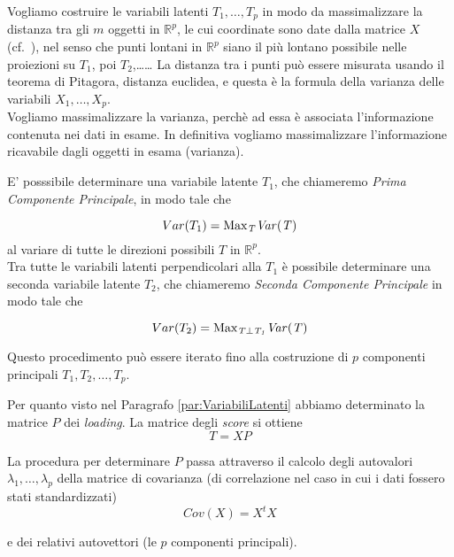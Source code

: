 \documentclass[
  11pt,
]{book}
\begin{document}
Vogliamo costruire le variabili latenti \(T_1,\dots,T_p\) in modo da massimalizzare la distanza
tra gli \(m\) oggetti in \(\mathbb{R}^p\), le cui coordinate sono date dalla matrice \(X\) (cf.~),
nel senso che punti lontani in \(\mathbb{R}^p\) siano il più
lontano possibile nelle proiezioni su \(T_1\), poi \(T_2\),\ldots\ldots{}
La distanza tra i punti può essere misurata usando il teorema di Pitagora, distanza euclidea,
e questa è la formula della varianza delle variabili \(X_1,\dots,X_p\).\\
Vogliamo massimalizzare la varianza, perchè ad essa è associata l'informazione contenuta nei dati
in esame.
In definitiva vogliamo massimalizzare l'informazione ricavabile dagli oggetti in esama (varianza).

E' posssibile determinare una variabile latente \(T_1\), che chiameremo \emph{Prima Componente Principale},
in modo tale che

\begin{equation}
Var (T_1)=\rm{Max}_{\it{T}}\it{Var(T)}
\end{equation}
al variare di tutte le direzioni possibili \(T\) in \(\mathbb{R}^p\).\\
Tra tutte le variabili latenti perpendicolari alla \(T_1\) è possibile determinare una seconda
variabile latente \(T_2\), che chiameremo \emph{Seconda Componente Principale} in modo tale che

\begin{equation}
Var (T_2)=\rm{Max}_{\it{T\perp T_1}}\it{Var(T)}
\end{equation}

Questo procedimento può essere iterato fino alla costruzione di \(p\) componenti principali
\(T_1,T_2,\dots,T_p\).

Per quanto visto nel Paragrafo \ref{par:VariabiliLatenti} abbiamo determinato la matrice \(P\)
dei \emph{loading}. La matrice degli \emph{score} si ottiene
\begin{equation}\label{eq:Score}
T=XP
\end{equation}

La procedura per determinare \(P\) passa attraverso il calcolo degli autovalori
\(\lambda_1,\dots,\lambda_p\) della matrice di covarianza (di correlazione nel caso in cui i dati
fossero stati standardizzati)
\begin{equation}
Cov(X)=X^tX
\end{equation}

e dei relativi autovettori (le \(p\) componenti principali).
\end{document}

